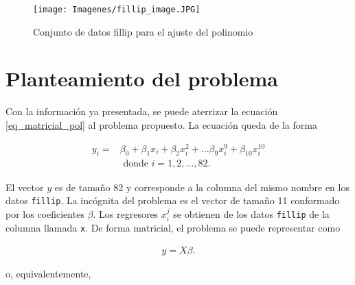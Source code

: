 \begin{figure}[h]
	\begin{center}
		\texttt{[image: Imagenes/fillip\_image.JPG]}
		\caption{Conjunto de datos fillip para el ajuste del polinomio}
		\label{fillip_graph}
	\end{center}
\end{figure}

\section{Planteamiento del problema}
Con la información ya presentada, se puede aterrizar la ecuación \ref{eq_matricial_pol} al problema propuesto. La ecuación queda de la forma 

\begin{align*}
		y_i = & \beta_0 + \beta_1 x_i + \beta_2 x_i^{2} + \dots \beta_{9} x_{i}^{9} + \beta_{10} x_{i}^{10} \\ 
		& \text{ donde } i = 1, 2, \dots , 82.
\end{align*}

El vector $y$ es de tamaño 82 y corresponde a la columna del mismo nombre en los datos \texttt{fillip}. La incógnita del problema es el vector de tamaño 11 conformado por los coeficientes $\beta$. Los regresores $x_i^{j}$ se obtienen de los datos \texttt{fillip} de la columna llamada \texttt{x}. De forma matricial, el problema se puede representar como 
  
\begin{equation} \label{eq_matricial}
	\begin{aligned}
		y = X \beta.
	\end{aligned}
\end{equation}

\noindent o, equivalentemente,

